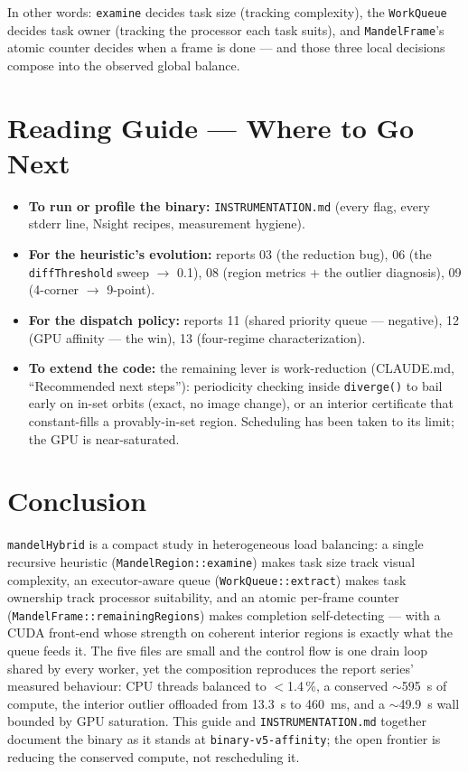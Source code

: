 \documentclass[
	english,
	letterpaper, oneside
]{article}
\begin{document}
In other words: \texttt{examine} decides task size (tracking complexity),
the \texttt{WorkQueue} decides task owner (tracking the
processor each task suits), and \texttt{MandelFrame}'s atomic counter decides
when a frame is done --- and those three local decisions compose into the
observed global balance.

\section{Reading Guide --- Where to Go Next}

\begin{itemize}
    \item \textbf{To run or profile the binary:} \texttt{INSTRUMENTATION.md} (every
    flag, every stderr line, Nsight recipes, measurement hygiene).
    \item \textbf{For the heuristic's evolution:} reports 03 (the reduction bug), 06
    (the \texttt{diffThreshold} sweep $\to$ 0.1), 08 (region metrics + the outlier
    diagnosis), 09 (4-corner $\to$ 9-point).
    \item \textbf{For the dispatch policy:} reports 11 (shared priority queue ---
    negative), 12 (GPU affinity --- the win), 13 (four-regime characterization).
    \item \textbf{To extend the code:} the remaining lever is work-reduction
    (CLAUDE.md, ``Recommended next steps''): periodicity checking inside
    \texttt{diverge()} to bail early on in-set orbits (exact, no image change), or an
    interior certificate that constant-fills a provably-in-set region. Scheduling has
    been taken to its limit; the GPU is near-saturated.
\end{itemize}

\section{Conclusion}

\texttt{mandelHybrid} is a compact study in heterogeneous load balancing: a single
recursive heuristic (\texttt{MandelRegion::examine}) makes task size track visual
complexity, an executor-aware queue (\texttt{WorkQueue::extract}) makes task
ownership track processor suitability, and an atomic per-frame counter
(\texttt{MandelFrame::remainingRegions}) makes completion self-detecting --- with a
CUDA front-end whose strength on coherent interior regions is exactly what the
queue feeds it. The five files are small and the control flow is one drain loop
shared by every worker, yet the composition reproduces the report series'
measured behaviour: CPU threads balanced to $<$1.4\,\%, a conserved $\sim$595~s of
compute, the interior outlier offloaded from 13.3~s to 460~ms, and a $\sim$49.9~s
wall bounded by GPU saturation. This guide and \texttt{INSTRUMENTATION.md} together
document the binary as it stands at \texttt{binary-v5-affinity}; the open frontier
is reducing the conserved compute, not rescheduling it.
\end{document}
